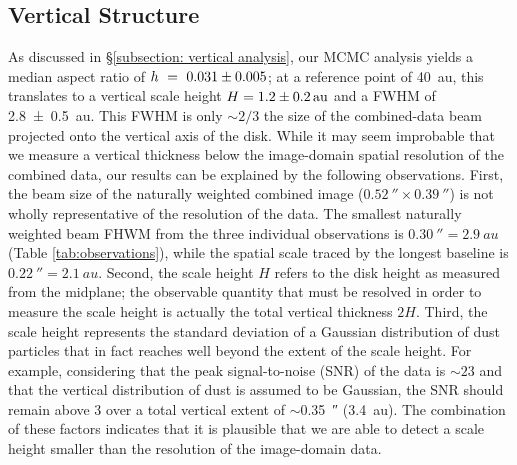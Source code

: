 \documentclass[modern]{aastex62}
\begin{document}

\subsection{Vertical Structure}
\label{subsection: vertical discussion}

As discussed in \S \ref{subsection: vertical analysis}, our MCMC analysis yields a median aspect ratio of $h~=~\num{0.031 \pm 0.005}$; at a reference point of \SI{40}{au}, this translates to a vertical scale height $H = \SI{1.2 \pm 0.2}{au}$ and a FWHM of \SI{2.8 \pm 0.5}{au}.
This FWHM is only $\sim 2/3$ the size of the combined-data beam projected onto the vertical axis of the disk.
While it may seem improbable that we measure a vertical thickness below the image-domain spatial resolution of the combined data, our results can be explained by the following observations.
First, the beam size of the naturally weighted combined image ($\SI{0.52}{\arcsecond} \times \SI{0.39}{\arcsecond}$) is not wholly representative of the resolution of the data. 
The smallest naturally weighted beam FHWM from the three individual observations is $\SI{0.30}{\arcsecond} = \SI{2.9}{au}$ (Table \ref{tab:observations}), while the spatial scale traced by the longest baseline is $\SI{0.22}{\arcsecond} = \SI{2.1}{au}$.
Second, the scale height $H$ refers to the disk height as measured from the midplane; the observable quantity that must be resolved in order to measure the scale height is actually the total vertical thickness $2H$.
Third, the scale height represents the standard deviation of a Gaussian distribution of dust particles that in fact reaches well beyond the extent of the scale height.
For example, considering that the peak signal-to-noise (SNR) of the data is $\sim 23$ and that the vertical distribution of dust is assumed to be Gaussian, the SNR should remain above 3 over a total vertical extent of $\sim$\SI{0.35}{\arcsecond} (\SI{3.4}{au}). 
The combination of these factors indicates that it is plausible that we are able to detect a scale height smaller than the resolution of the image-domain data.
\end{document}
